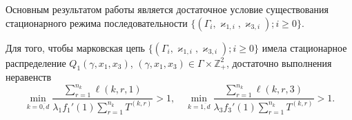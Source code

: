 \documentclass{report}
\begin{document}
Основным результатом работы является достаточное условие существования стационарного режима последовательности $\{(\Gamma_i, \varkappa_{1,i},\varkappa_{3,i}); i \geqslant 0\}$.
\begin{theorem}
Для того, чтобы марковская цепь $\{(\Gamma_i, \varkappa_{1,i},\varkappa_{3,i}); i \geqslant 0\}$ имела стационарное распределение $Q_1(\gamma,x_1,x_3)$, $(\gamma,x_1,x_3)\in \Gamma \times {\mathbb Z}^2_+$, достаточно выполнения неравенств
\begin{equation}
\min_{k=\overline{0,d}} { \frac{\sum_{r = 1}^{n_k} \ell(k,r,1) }{\lambda_1 f_1'(1) \sum_{r=1}^{n_k} T^{(k,r)} }}>1, \quad 
\min_{k=\overline{1,d}} { \frac{\sum_{r = 1}^{n_k} \ell(k,r,3) }{\lambda_3 f_3'(1) \sum_{r=1}^{n_k} T^{(k,r)} }}>1.
\label{sufficient:double}
\end{equation}
\label{sufficient:double:theorem}
\end{theorem}
\end{document}
